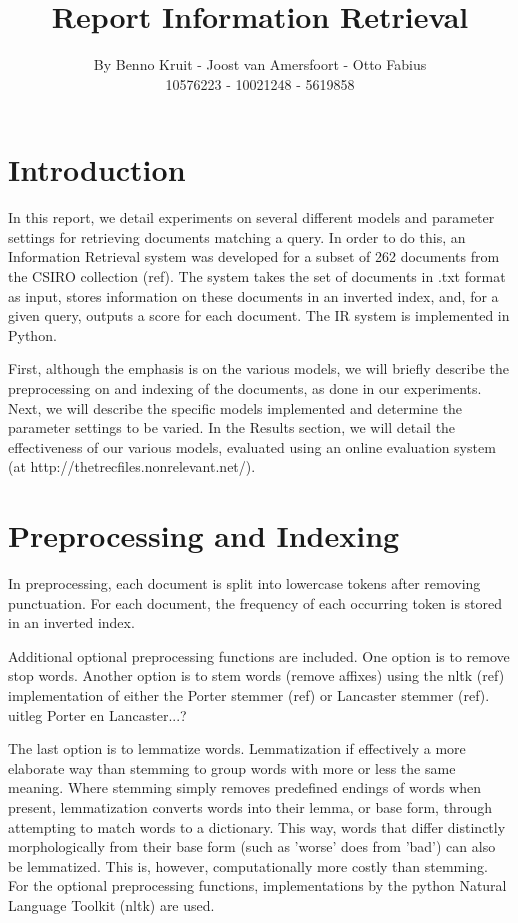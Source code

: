 \documentclass{article}
\begin{document}
\title{Report Information Retrieval}
\author{By Benno Kruit - Joost van Amersfoort - Otto Fabius \\ 10576223 - 10021248 - 5619858}
\maketitle

\section*{Introduction}
In this report, we detail experiments on several different models and parameter settings for retrieving documents matching a query. %
In order to do this, an Information Retrieval system was developed for a subset of 262 documents from the CSIRO collection (ref). The system takes the set of documents in .txt format as input, stores information on these documents in an inverted index, and, for a given query, outputs a score for each document. The IR system is implemented in Python.

First, although the emphasis is on the various models, we will briefly describe the preprocessing on and indexing of the documents, as done in our experiments. Next, we will describe the specific models implemented and determine the parameter settings to be varied. In the Results section, we will detail the effectiveness of our various models, evaluated using an online evaluation system (at  http://thetrecfiles.nonrelevant.net/).

\section*{Preprocessing and Indexing}
In preprocessing, each document is split into lowercase tokens after removing punctuation. For each document, the frequency of each occurring token is stored in an inverted index. 

Additional optional preprocessing functions are included. One option is to remove stop words. Another option is to stem words (remove affixes) using the nltk (ref) implementation of either the Porter stemmer (ref) or Lancaster stemmer (ref). uitleg Porter en Lancaster...? 

The last option is to lemmatize words. Lemmatization if effectively a more elaborate way than stemming to group words with more or less the same meaning. Where stemming simply removes predefined endings of words when present, lemmatization converts words into their lemma, or base form, through attempting to match words to a dictionary. This way, words that differ distinctly morphologically from their base form (such as 'worse' does from 'bad') can also be lemmatized. This is, however, computationally more costly than stemming. For the optional preprocessing functions, implementations by the python Natural Language Toolkit (nltk) are used.
\end{document}

